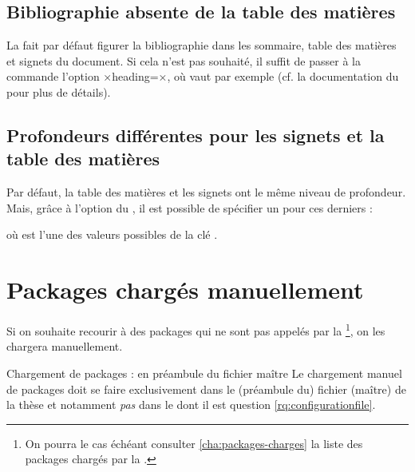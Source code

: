 
\subsection{Bibliographie absente de la table des matières}

La \yatcl{} fait par défaut figurer la bibliographie dans les sommaire, table
des matières et signets du document. Si cela n'est pas souhaité, il suffit de
passer à la commande  l'option
×heading=×, où  vaut par exemple
 (cf. la documentation du  pour plus
de détails).

\subsection{Profondeurs différentes pour les signets et la table des matières}

Par défaut, la table des matières et les signets ont le même niveau de
profondeur. Mais, grâce à l'option  du
, il est possible de spécifier un  pour
ces derniers :
\begin{preamblecode}[title=Par exemple dans le \File{\configurationfile}]
\end{preamblecode}
où  est l'une des valeurs possibles de la clé
.

\section{Packages chargés manuellement}
\label{sec:options-de-classes}
Si on souhaite recourir à des packages qui ne sont pas appelés par la
\yatcl{}\footnote{On pourra le cas échéant consulter
  \vref{cha:packages-charges} la liste des packages chargés par la \yatcl{}.},
on les chargera manuellement.

\begin{dbwarning}{Chargement de packages : en préambule du fichier maître}{}
  Le chargement manuel de packages doit se faire exclusivement dans le
  (préambule du) fichier (maître) de la thèse et notamment \emph{pas} dans le
  \File{\configurationfile} dont il est question
  \vref{rq:configurationfile}.
\end{dbwarning}

%
\iffalse
\fi
